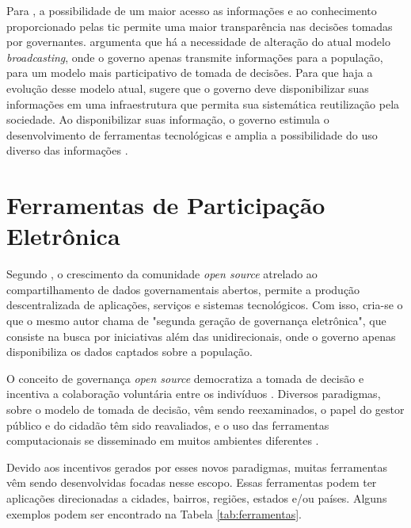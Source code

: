 \vspace{0.3CM}
\par
Para , a possibilidade de um maior acesso as informações e ao conhecimento proporcionado pelas \acrshort{tic}
permite uma maior transparência nas decisões tomadas por governantes.  argumenta que há a necessidade de alteração do atual modelo
\textit{broadcasting}, onde o governo apenas transmite informações para a população, para um modelo mais participativo de tomada de decisões.
Para que haja a evolução desse modelo atual,  sugere que o governo deve disponibilizar suas informações em uma infraestrutura que permita sua sistemática reutilização
pela sociedade. Ao disponibilizar suas informação, o governo estimula o desenvolvimento de ferramentas tecnológicas e amplia a possibilidade 
do uso diverso das informações \cite{zuiderwijk2012socio}.

\section{Ferramentas de Participação Eletrônica}
\label{sec:e-part tools}
Segundo , o crescimento da comunidade \textit{open source} atrelado ao compartilhamento de dados governamentais abertos, permite a produção
descentralizada de aplicações, serviços e sistemas tecnológicos. Com isso, cria-se o que o mesmo autor chama de "segunda geração de governança eletrônica", que consiste na busca
por iniciativas além das unidirecionais, onde o governo apenas disponibiliza os dados captados sobre a população.

\par
O conceito de governança \textit{open source} democratiza a tomada de decisão e incentiva a colaboração voluntária entre os indivíduos \cite{rushkoff2003open}.
Diversos paradigmas, sobre o modelo de tomada de decisão, vêm sendo reexaminados, o papel do gestor público e do cidadão têm sido reavaliados,
e o uso das ferramentas computacionais se disseminado em muitos ambientes diferentes \cite{medeiros2009novos}.

\par
Devido aos incentivos gerados por esses novos paradigmas, muitas ferramentas vêm sendo desenvolvidas focadas nesse escopo.
Essas ferramentas podem ter aplicações direcionadas a cidades, bairros, regiões, estados e/ou países.  
Alguns exemplos podem ser encontrado na Tabela \ref{tab:ferramentas}.

